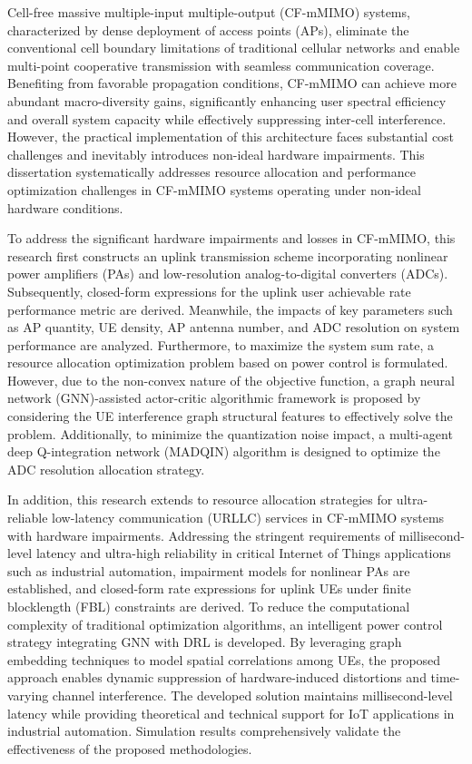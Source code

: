 \begin{englishabstract}
Cell-free massive multiple-input multiple-output (CF-mMIMO) systems, characterized by dense deployment of access points (APs), eliminate the conventional cell boundary limitations of traditional cellular networks and enable multi-point cooperative transmission with seamless communication coverage. Benefiting from favorable propagation conditions, CF-mMIMO can achieve more abundant macro-diversity gains, significantly enhancing user spectral efficiency and overall system capacity while effectively suppressing inter-cell interference. However, the practical implementation of this architecture faces substantial cost challenges and inevitably introduces non-ideal hardware impairments. This dissertation systematically addresses resource allocation and performance optimization challenges in CF-mMIMO systems operating under non-ideal hardware conditions.

To address the significant hardware impairments and losses in CF-mMIMO, this research first constructs an uplink transmission scheme incorporating nonlinear power amplifiers (PAs) and low-resolution analog-to-digital converters (ADCs). Subsequently, closed-form expressions for the uplink user achievable rate performance metric are derived. Meanwhile, the impacts of key parameters such as AP quantity, UE density, AP antenna number, and ADC resolution on system performance are analyzed. Furthermore, to maximize the system sum rate, a resource allocation optimization problem based on power control is formulated. However, due to the non-convex nature of the objective function, a graph neural network (GNN)-assisted actor-critic algorithmic framework is proposed by considering the UE interference graph structural features to effectively solve the problem. Additionally, to minimize the quantization noise impact, a multi-agent deep Q-integration network (MADQIN) algorithm is designed to optimize the ADC resolution allocation strategy.

In addition, this research extends to resource allocation strategies for ultra-reliable low-latency communication (URLLC) services in CF-mMIMO systems with hardware impairments. Addressing the stringent requirements of millisecond-level latency and ultra-high reliability in critical Internet of Things applications such as industrial automation, impairment models for nonlinear PAs are established, and closed-form rate expressions for uplink UEs under finite blocklength (FBL) constraints are derived. To reduce the computational complexity of traditional optimization algorithms, an intelligent power control strategy integrating GNN with DRL is developed. By leveraging graph embedding techniques to model spatial correlations among UEs, the proposed approach enables dynamic suppression of hardware-induced distortions and time-varying channel interference. The developed solution maintains millisecond-level latency while providing theoretical and technical support for IoT applications in industrial automation. Simulation results comprehensively validate the effectiveness of the proposed methodologies.


\end{englishabstract}
